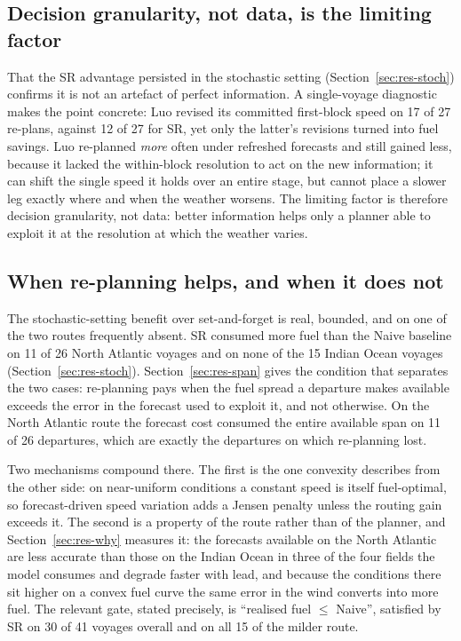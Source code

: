 \documentclass[review,authoryear]{elsarticle}
\begin{document}
\subsection{Decision granularity, not data, is the limiting factor}
That the SR advantage persisted in the stochastic setting
(Section~\ref{sec:res-stoch}) confirms it is not an artefact of perfect information. A single-voyage
diagnostic makes the point concrete: Luo revised its committed first-block speed on
17 of 27 re-plans, against 12 of 27 for SR, yet only the latter's revisions turned
into fuel savings. Luo re-planned \emph{more} often under refreshed forecasts and
still gained less, because it lacked the within-block resolution to act on the new information; it
can shift the single speed it holds over an entire stage, but cannot place a slower leg exactly where
and when the weather worsens. The limiting factor is therefore decision granularity, not data: better
information helps only a planner able to exploit it at the resolution at which the weather varies.

\subsection{When re-planning helps, and when it does not}
\label{sec:disc-bound}
The stochastic-setting benefit over set-and-forget is real, bounded, and on one of the two routes
frequently absent. SR consumed more fuel than the Naive baseline on 11 of 26 North
Atlantic voyages and on none of the 15 Indian Ocean voyages
(Section~\ref{sec:res-stoch}). Section~\ref{sec:res-span} gives the condition that separates the two
cases: re-planning pays when the fuel spread a departure makes available exceeds the error in the
forecast used to exploit it, and not otherwise. On the North Atlantic route the forecast cost
consumed the entire available span on 11 of 26 departures, which are exactly the departures on which
re-planning lost.

Two mechanisms compound there. The first is the one convexity describes from the other side: on
near-uniform conditions a constant speed is itself fuel-optimal, so forecast-driven speed variation
adds a Jensen penalty unless the routing gain exceeds it. The second is a property of the route
rather than of the planner, and Section~\ref{sec:res-why} measures it: the forecasts available on the
North Atlantic are less accurate than those on the Indian Ocean in three of the four fields the model
consumes and degrade faster with lead, and because the conditions there sit higher on a convex fuel
curve the same error in the wind converts into more fuel. The relevant gate,
stated precisely, is ``realised fuel $\le$ Naive'', satisfied by SR on 30 of 41
voyages overall and on all 15 of the milder route.
\end{document}
